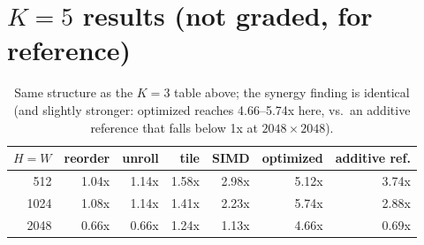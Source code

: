 \documentclass[11pt]{article}
\begin{document}
\appendix
\section{$K{=}5$ results (not graded, for reference)}
\label{app:k5}
\begin{table}[h]
\centering
\begin{tabular}{r r r r r r r}
\toprule
$H{=}W$ & reorder & unroll & tile & SIMD & optimized & additive ref. \\
\midrule
512  & 1.04x & 1.14x & 1.58x & 2.98x & 5.12x & 3.74x \\
1024 & 1.08x & 1.14x & 1.41x & 2.23x & 5.74x & 2.88x \\
2048 & 0.66x & 0.66x & 1.24x & 1.13x & 4.66x & 0.69x \\
\bottomrule
\end{tabular}
\caption{Same structure as the $K{=}3$ table above; the synergy finding is identical
(and slightly stronger: optimized reaches 4.66--5.74x here, vs.\ an additive reference
that falls below 1x at $2048{\times}2048$).}
\end{table}
\end{document}

